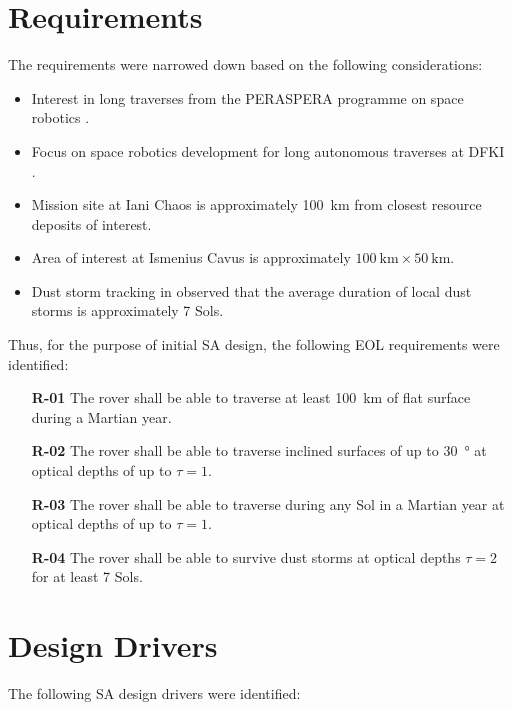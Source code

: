 \clearpage
\section{Requirements}
\label{sec:RequirementsAndDesignDrivers:Requirements}
The requirements were narrowed down based on the following considerations:
\begin{itemize}
    \item Interest in long traverses from the PERASPERA programme on space robotics .
    \item Focus on space robotics development for long autonomous traverses at \ac{DFKI}  .
    \item Mission site at Iani Chaos is approximately \SI{100}{\kilo\meter} from closest resource deposits of interest.
    \item Area of interest at Ismenius Cavus is approximately $\SI{100}{\kilo\meter} \times \SI{50}{\kilo\meter}$.
    \item Dust storm tracking in  observed that the average duration of local dust storms is approximately 7 Sols.
\end{itemize}

Thus, for the purpose of initial \ac{SA} design, the following \ac{EOL} requirements were identified:

\begin{itemize}
    \item[\textbf{R-01}] The rover shall be able to traverse at least \SI{100}{\kilo\meter} of flat surface during a Martian year.
    \item[\textbf{R-02}] The rover shall be able to traverse inclined surfaces of up to \SI{30}{\degree} at optical depths of up to $\tau = 1$.
    \item[\textbf{R-03}] The rover shall be able to traverse during any Sol in a Martian year at optical depths of up to $\tau = 1$.
    \item[\textbf{R-04}] The rover shall be able to survive dust storms at optical depths $\tau = 2$ for at least 7 Sols.
\end{itemize}


\section{Design Drivers}
\label{sec:RequirementsAndDesignDrivers:DesignDrivers}
The following \ac{SA} design drivers were identified:

